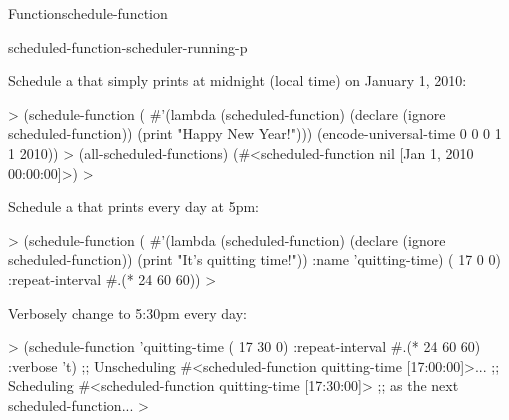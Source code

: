 \documentclass[10pt,twoside,english,pdftex]{article}
\begin{document}
\begin{functiondoc}{Function}{schedule-function}
\begin{alsos}{scheduled-function-scheduler-running-p}
\end{alsos}

%
\fnexamples Schedule a  that simply prints
  at midnight (local time) on January 1, 2010:
%
\W\supp
\begin{example}
  > (schedule-function
      (
        #'(lambda (scheduled-function)
            (declare (ignore scheduled-function))
            (print "Happy New Year!")))
       (encode-universal-time 0 0 0 1 1 2010))
  > (all-scheduled-functions)
  (#<scheduled-function nil [Jan 1, 2010 00:00:00]>)
  >
\end{example}
%
%
%
%
Schedule a  that prints   every day at 5pm:
%
\W\supp\notpretop
\begin{example}
  > (schedule-function
      (
        #'(lambda (scheduled-function)
            (declare (ignore scheduled-function))
            (print "It's quitting time!"))
        :name 'quitting-time)
       ( 17 0 0) :repeat-interval #.(* 24 60 60))
  >
\end{example}
%
%
%
Verbosely change  to 5:30pm every day:
%
\W\supp\notpretop
\begin{example}
  > (schedule-function 'quitting-time ( 17 30 0)
      :repeat-interval #.(* 24 60 60)
      :verbose 't)
  ;; Unscheduling #<scheduled-function quitting-time [17:00:00]>...
  ;; Scheduling #<scheduled-function quitting-time [17:30:00]> 
  ;; as the next scheduled-function...
  >
\end{example}

\end{functiondoc}

\end{document}

